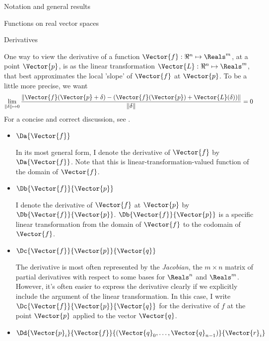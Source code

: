 \begin{plSection}{Notation and general results}
\begin{plSection}{Functions on real vector spaces}
\end{plSection}%
\begin{plSection}{Derivatives}
\label{sec:derivatives}

One way to view the derivative of a function
$\Vector{f}:{\Re}^{n} \mapsto \Reals^{m}$,
at a point $\Vector{p}$,
is as the linear transformation $\Vector{L}:{\Re}^{n} \mapsto \Reals^{m}$,
that best approximates the local 'slope' of $\Vector{f}$ at $\Vector{p}$.
To be a little more precise, we want
\begin{displaymath}
\lim_{ \|{\bf \delta}  \| \mapsto 0}
{ \|{\Vector{f}(\Vector{p} + {\bf \delta}) - (\Vector{f}(\Vector{p}) + \Vector{L}({\bf\delta})) \|}
  \over  \|{\bf \delta}  \|}
 = 0
\end{displaymath}
For a concise and correct discussion, see .

\begin{itemize}

\item $\Da{\Vector{f}}$

In its most general form,
I denote the derivative of $\Vector{f}$ by $\Da{\Vector{f}}$.
Note that this is
linear-transformation-valued function of the domain of $\Vector{f}$.

\item $\Db{\Vector{f}}{\Vector{p}}$

I denote the derivative of $\Vector{f}$ at $\Vector{p}$ by $\Db{\Vector{f}}{\Vector{p}}$.
$\Db{\Vector{f}}{\Vector{p}}$ is a specific linear transformation from
the domain of $\Vector{f}$ to the codomain of $\Vector{f}$.

\item $\Dc{\Vector{f}}{\Vector{p}}{\Vector{q}}$

The derivative is most often represented by the {\it Jacobian},
the $m \times n$ matrix of partial derivatives
with respect to some bases for $\Reals^n$ and $\Reals^m$.
However, it's often easier to express the derivative clearly if we
explicitly include the argument of the linear transformation.
In this case, I write $\Dc{\Vector{f}}{\Vector{p}}{\Vector{q}}$
for the derivative of $f$ at the point $\Vector{p}$
applied to the vector $\Vector{q}$.

\item $\Dd{\Vector{p}_i}{\Vector{f}}{(\Vector{q}_0,\ldots,\Vector{q}_{n-1})}{\Vector{r}_i}$


\end{itemize}
\end{plSection}
\end{plSection}
